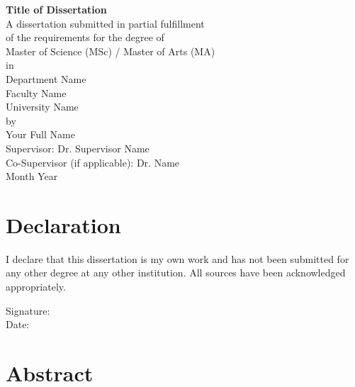 \documentclass[12pt,a4paper,oneside]{report}
\begin{document}
\begin{titlepage}
    \centering
    \vspace*{2cm}
    
    {\huge\bfseries Title of Dissertation}\\[1.5cm]
    
    A dissertation submitted in partial fulfillment\\
    of the requirements for the degree of\\[0.5cm]
    
    {\large Master of Science (MSc) / Master of Arts (MA)}\\[0.5cm]
    
    in\\
    Department Name\\
    Faculty Name\\
    University Name\\[1.5cm]
    
    by\\[0.3cm]
    {\large Your Full Name}\\[0.5cm]
    
    Supervisor: Dr. Supervisor Name\\
    Co-Supervisor (if applicable): Dr. Name\\[1cm]
    
    Month Year
    
\end{titlepage}

\chapter*{Declaration}

I declare that this dissertation is my own work and has not been submitted for any other degree at any other institution. All sources have been acknowledged appropriately.

\vspace{1cm}
Signature:\\
Date:

\chapter*{Abstract}
\end{document}
